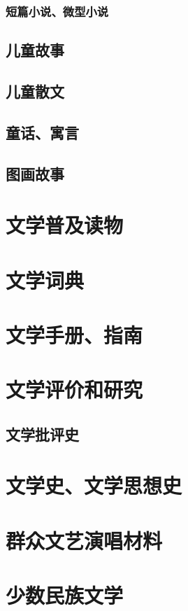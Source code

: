 \documentclass[UTF8]{../../RepresentationUniverse}
\begin{document}
        \subsubsection{短篇小说、微型小说}
    \subsection{儿童故事}
    \subsection{儿童散文}
    \subsection{童话、寓言}
    \subsection{图画故事}



\section{文学普及读物}
\section{文学词典}
\section{文学手册、指南}

\section{文学评价和研究}
    \subsection{文学批评史}

\section{文学史、文学思想史}

\section{群众文艺演唱材料}

\section{少数民族文学}
\end{document}
